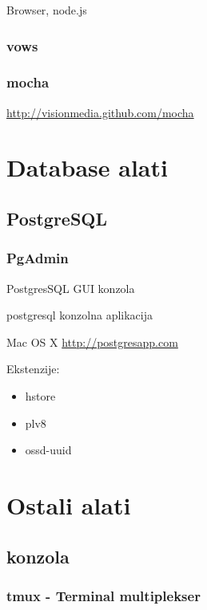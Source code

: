 \documentclass[times, utf8, seminar]{fit}
\begin{document}
Browser, node.js

\subsection{vows}

\subsection{mocha}

\url{http://visionmedia.github.com/mocha}


\chapter{Database alati}

\section{PostgreSQL}

\subsection{PgAdmin}

PostgresSQL GUI konzola


postgresql konzolna aplikacija


Mac OS X \url{http://postgresapp.com}

Ekstenzije:
\begin{itemize}
  \item hstore
  \item plv8
  \item ossd-uuid  
\end{itemize}

\chapter{Ostali alati}

\section{konzola}

\subsection{tmux - Terminal multiplekser }
\end{document}
